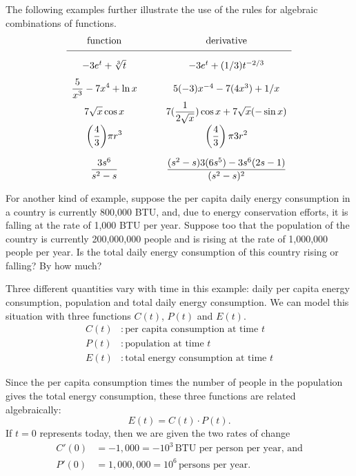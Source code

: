 	The following examples further illustrate the use of the rules for algebraic combinations of functions.
\[
\begin{array}{cccc}
   \mbox{function}    &  &        &\mbox{derivative} \\[.05in]  \hline
\mbox{\rule{0in}{.25in}$-3e^{t} + \sqrt[3]{t}$}    &  &        &\mbox{\rule{0in}{.25in}$-3e^{t} + (1/3)t^{-2/3}$}  \\[.1in]
\displaystyle{\frac{5}{x^3}} -7x^4+\ln x & & &5(-3)x^{-4} - 7(4x^3) + 1/x  \\[.1in]
\displaystyle{7 \sqrt{x} \cos x}     & &      &7 \displaystyle{(\frac{1}{2\sqrt{x}})} \cos x +7\sqrt{x}(-\sin x) \\[.1in]
\displaystyle{\left(\frac43\right)} \pi r^3  &     &   &\displaystyle{\left(\frac43\right) \pi 3r^2} \\[.22in]
\displaystyle{ \frac{3s^6}{s^2 - s} }   &   &     &\displaystyle{ \frac{(s^2-s)3(6s^5) -3s^6(2s-1)}{(s^{2} - s)^2} }   \end{array}
\]

	For another kind of example, suppose the per capita daily energy consumption in a country is currently 800,000 BTU, and, due to energy conservation efforts, it is falling at the rate of 1,000 BTU per year.  
Suppose too that the population of the country is currently 200,000,000 people and is rising at the rate of 1,000,000 people per year.  Is the total daily energy consumption of this country rising or falling?  By how much?

Three different quantities vary with time in this example:  daily per capita energy consumption, population and total daily energy consumption.  We can model this situation with three functions  $C(t)$, $P(t)$ and $E(t)$.
\begin{align*}
C(t) &: \text{per capita consumption at time $t$} \\
P(t) &: \text{population at time $t$} \\
E(t) &: \text{total energy consumption at time $t$}
\end{align*}

Since the per capita consumption times the number of people in the
population gives the total energy consumption, these three functions
are related algebraically:
\[
E(t) = C(t) \cdot P(t).
\]
If $t=0$ represents today, then we are given the two rates of change
\begin{align*}
C'(0) & =  -1,000 = - 10^{3} \, \mbox{BTU per person per year, and} \\
P'(0) & =  1,000,000 = 10^{6} \, \mbox{persons per year.}
\end{align*}


